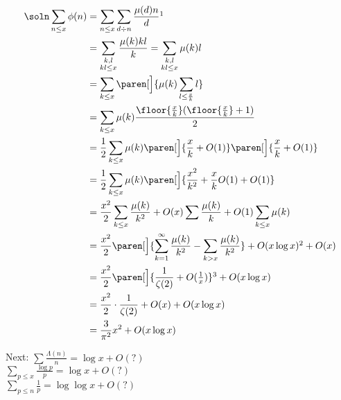 \begin{align*}
\soln \sum_{n\leq x}\phi(n) &= \sum_{n\leq x}\sum_{d\div n}\frac{\mu(d)n}{d}\footnotemark \\
&= \sum_{\substack{k,l\\kl\leq x}}\frac{\mu(k)kl}{k} = \sum_{\substack{k,l\\kl\leq x}}\mu(k)l \\
&= \sum_{k\leq x}\paren[\Big]{\mu(k)\sum_{l\leq\frac xk}l} \\
&= \sum_{k\leq x}\mu(k)\frac{\floor{\frac xk}(\floor{\frac xk}+1)}{2} \\
&= \frac12\sum_{k\leq x}\mu(k)\paren[\Big]{\frac xk+O(1)}\paren[\Big]{\frac xk+O(1)} \\
&= \frac12\sum_{k\leq x}\mu(k)\paren[\Big]{\frac{x^2}{k^2}+\frac{x}{k}O(1)+O(1)} \\
&= \frac{x^2}{2}\sum_{k\leq x}\frac{\mu(k)}{k^2} + O(x)\sum\frac{\mu(k)}{k} + O(1)\sum_{k\leq x}\mu(k) \\
&= \frac{x^2}{2}\paren[\Big]{\sum_{k=1}^\infty\frac{\mu(k)}{k^2}-\sum_{k>x}\frac{\mu(k)}{k^2}} + O(x\log x)\footnotemark + O(x) \\
&= \frac{x^2}{2}\paren[\Big]{\frac{1}{\zeta(2)}+O(\tfrac1x)}\footnotemark + O(x\log x) \\
&= \frac{x^2}{2}\cdot\frac{1}{\zeta(2)} + O(x) + O(x\log x) \\
&= \frac{3}{\pi^2}x^2 + O(x\log x)
\end{align*}\addtocounter{footnote}{-2}\addtocounter{footnote}{1}\addtocounter{footnote}{1}%
Next: $\sum\frac{\Lambda(n)}{n}=\log x+O(?)$ \\
$\sum_{p\leq x}\frac{\log p}{p}=\log x+O(?)$ \\
$\sum_{p\leq n}\frac1p=\log\log x+O(?)$
